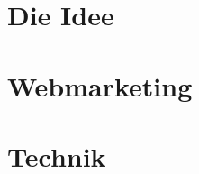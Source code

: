 \documentclass[11pt]{scrreprt}
\begin{document}

\tableofcontents
\part{Die Idee}

\part{Webmarketing}




\part{Technik}




\end{document}
